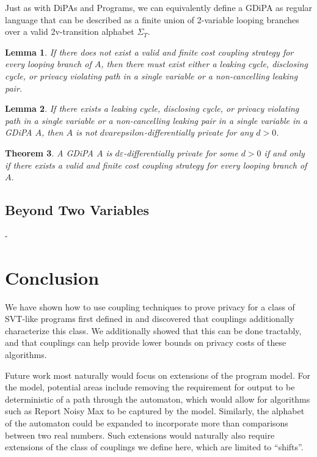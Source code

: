 \documentclass[12pt]{article}
\newtheorem{thm}{Theorem}[section]
\newtheorem{lemma}[thm]{Lemma}
\theoremstyle{definition}
\begin{document}
Just as with DiPAs and Programs, we can equivalently define a GDiPA as regular language that can be described as a finite union of 2-variable looping branches over a valid 2v-transition alphabet $\Sigma_T$. 


\begin{lemma}
    If there does not exist a valid and finite cost coupling strategy for every looping branch of $A$, then there must exist either a leaking cycle, disclosing cycle, or privacy violating path in a single variable or a non-cancelling leaking pair. 
\end{lemma}

\begin{lemma}
    If there exists a leaking cycle, disclosing cycle, or privacy violating path in a single variable or a non-cancelling leaking pair in a single variable in a GDiPA $A$, then $A$ is not $dvarepsilon$-differentially private for any $d>0$. 
\end{lemma}

\begin{thm}
    A GDiPA $A$ is $d\varepsilon$-differentially private for some $d>0$ if and only if there exists a valid and finite cost coupling strategy for every looping branch of $A$. 
\end{thm}

\subsection{Beyond Two Variables}

- 

\section{Conclusion}
We have shown how to use coupling techniques to prove privacy for a class of SVT-like programs first defined in \cite{chadhaLinearTimeDecidability2021} and discovered that couplings additionally characterize this class. We additionally showed that this can be done tractably, and that couplings can help provide lower bounds on privacy costs of these algorithms. 

Future work most naturally would focus on extensions of the program model. For the model, potential areas include removing the requirement for output to be deterministic of a path through the automaton, which would allow for algorithms such as Report Noisy Max to be captured by the model. Similarly, the alphabet of the automaton could be expanded to incorporate more than comparisons between two real numbers. 
Such extensions would naturally also require extensions of the class of couplings we define here, which are limited to ``shifts''. 
\end{document}
